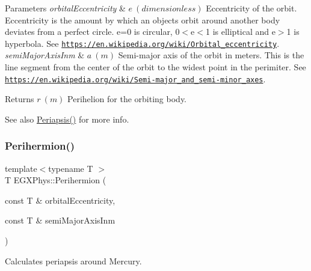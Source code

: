 \begin{DoxyParams}{Parameters}
{\em orbital\+Eccentricity} & $ e\ (dimensionless)$ Eccentricity of the orbit. Eccentricity is the amount by which an objects orbit around another body deviates from a perfect circle. e=0 is circular, 0$<$e$<$1 is elliptical and e$>$1 is hyperbola. See \href{https://en.wikipedia.org/wiki/Orbital_eccentricity}{\tt https\+://en.\+wikipedia.\+org/wiki/\+Orbital\+\_\+eccentricity}. \\
\hline
{\em semi\+Major\+Axis\+Inm} & $ a\ (m)$ Semi-\/major axis of the orbit in meters. This is the line segment from the center of the orbit to the widest point in the perimiter. See \href{https://en.wikipedia.org/wiki/Semi-major_and_semi-minor_axes}{\tt https\+://en.\+wikipedia.\+org/wiki/\+Semi-\/major\+\_\+and\+\_\+semi-\/minor\+\_\+axes}. \\
\hline
\end{DoxyParams}
\begin{DoxyReturn}{Returns}
$ r\ (m)$ Perihelion for the orbiting body. 
\end{DoxyReturn}
\begin{DoxySeeAlso}{See also}
\mbox{\hyperlink{group___e_g_x_phys-_periapsis_gad487212733711bc2ce73c8137c9309c3}{Periapsis()}} for more info. 
\end{DoxySeeAlso}
\mbox{\label{group___e_g_x_phys-_periapsis_ga4e2090fddafea2fca70acd6f7a1eddc4}} 
\subsubsection{\texorpdfstring{Perihermion()}{Perihermion()}}
{\footnotesize\ttfamily template$<$typename T $>$ \\
T E\+G\+X\+Phys\+::\+Perihermion (\begin{DoxyParamCaption}\item[{const T \&}]{orbital\+Eccentricity,  }\item[{const T \&}]{semi\+Major\+Axis\+Inm }\end{DoxyParamCaption})}



Calculates periapsis around Mercury. 


